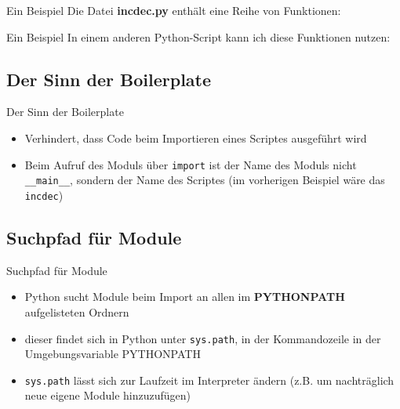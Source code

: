\begin{frame}{Ein Beispiel}
	Die Datei \textbf{incdec.py} enth\"alt eine Reihe von Funktionen:
	
\end{frame}

\begin{frame}{Ein Beispiel}
	In einem anderen Python-Script kann ich diese Funktionen nutzen:
	
\end{frame}



\subsection{Der Sinn der Boilerplate}
\begin{frame}{Der Sinn der Boilerplate}
	\begin{itemize}
		\item Verhindert, dass Code beim Importieren eines Scriptes ausgef\"uhrt wird
		\item Beim Aufruf des Moduls \"uber \texttt{import} ist der Name des Moduls nicht \texttt{\_\_main\_\_}, sondern der Name des Scriptes (im vorherigen Beispiel w\"are das \texttt{incdec})
	\end{itemize}
\end{frame}



\subsection{Suchpfad f\"ur Module}
\begin{frame}{Suchpfad f\"ur Module}
	\begin{itemize}
		\item Python sucht Module beim Import an allen im \textbf{PYTHONPATH} aufgelisteten Ordnern
		\item dieser findet sich in Python unter \texttt{sys.path}, in der Kommandozeile in der Umgebungsvariable PYTHONPATH
		\item \texttt{sys.path} l\"asst sich zur Laufzeit im Interpreter \"andern (z.B. um nachtr\"aglich neue eigene Module hinzuzuf\"ugen)
	\end{itemize}
\end{frame}

